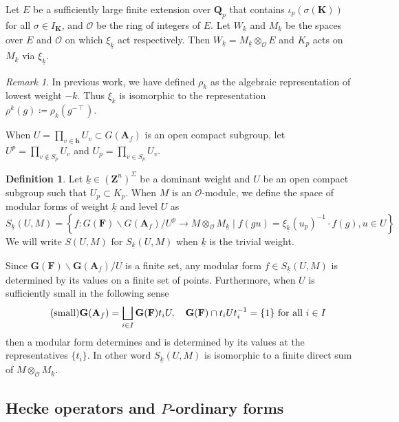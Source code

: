 \documentclass[leqno]{amsart}
\newcommand{\wt}[1]{\underline{ #1 }}
\newcommand{\GG}{\mathbf G}
\newcommand{\Z}{{\mathbf{Z}}}
\newcommand{\Qp}{\mathbf{Q}_p}
\newcommand{\A}{\mathbf A}
\newcommand{\finite}{\mathbf{h}}
\newcommand{\F}{{\mathbf{F}}} %
\newcommand{\K}{{\mathbf{K}}} %
\newcommand{\oo}{\mathcal{O}} %
\theoremstyle{definition}
\newtheorem{defn}[thm]{Definition}
\theoremstyle{remark}
\newtheorem{rem}[thm]{Remark}
\begin{document}
Let $E$ be a sufficiently large
finite extension over  $\Qp$
that contains $\iota_p(\sigma(\K))$
for all  $\sigma\in I_\K$,
and $\oo$ be the ring of integers of $E$.
Let $W_{\wt{k}}$ and $M_{\wt{k}}$
be the spaces over $E$ and $\oo$ 
on which $\xi_{\wt{k}}$ act respectively.
Then $W_{\wt{k}}=M_{\wt{k}}\otimes_{\oo}E$
and $K_p$ acts on $M_{\wt{k}}$ via $\xi_{\wt{k}}$.

\begin{rem}
	In previous work, 
	we have defined $\rho_k$ as the 
	algebraic representation of lowest weight  $-k$.
	Thus $\xi_k$ is isomorphic to the representation 
	$\rho^k(g)\coloneqq \rho_k(g^{-\intercal})$.
\end{rem}



When $U=\prod_{v\in\finite}U_v\subset G(\A_f)$
is an open compact subgroup, 
let $U^p=\prod_{v\notin S_p}U_v$ and 
$U_p=\prod_{v\in S_p}U_v$.
\begin{defn}
Let $\wt{k}\in (\Z^n)^{\Sigma}$ be a dominant weight
and $U$ be an open compact subgroup 
such that $U_p\subset K_p$.
When $M$ is an $\oo$-module,
we define the space of modular forms
of weight $\wt{k}$ and level $U$ as 
\begin{equation}
S_{\wt{k}}(U,M)=
\left\{ f: G(\F)\backslash G(\A_f)/U^p 
\rightarrow M\otimes_{\oo}M_{\wt{k}}
\mid f(gu)=\xi_{\wt{k}}(u_p)^{-1}\cdot f(g), u\in U\right\} 
\end{equation}
We will write $S(U,M)$ for $S_{\wt{k}}(U,M)$
when $\wt{k}$ is the trivial weight.
\end{defn}


Since $\GG(\F)\backslash \GG(\A_f)/U$ is a finite set,
any modular form $f\in S_{\wt{k}}(U,M)$ 
is determined by its values on a finite set of points.
Furthermore, when $U$ 
is sufficiently small in the following sense
\begin{equation}\label{cond:small}\tag{\text{small}}
	\GG(\A_f)=\bigsqcup_{i\in I}
	\GG(\F)t_i U,\quad
	\GG(\F)\cap t_iUt_i^{-1}=\{1\} \text{ for all } i\in I
\end{equation}
then a modular form determines and is determined by
its values at the representatives $\{t_i\}$.
In other word  $S_{\wt{k}}(U,M)$ is
isomorphic to a finite direct sum of 
$M\otimes_{\oo}M_{\wt{k}}$.

\subsection{Hecke operators and $P$-ordinary forms}
\end{document}
